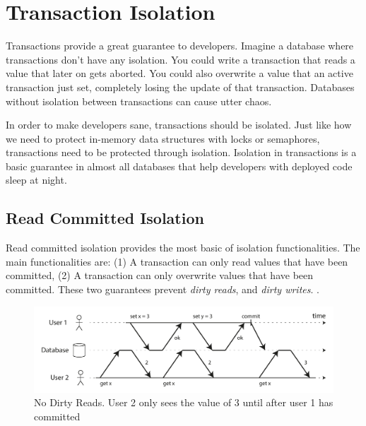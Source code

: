 \documentclass[conference]{IEEEtran}
\begin{document}
    \section{Transaction Isolation}

    Transactions provide a great guarantee to developers. Imagine a database where transactions don't have any isolation. You could write a transaction that reads a value that later on gets aborted. You could also overwrite a value that an active transaction just set, completely losing the update of that transaction. Databases without isolation between transactions can cause utter chaos. 
    
    In order to make developers sane, transactions should be isolated. Just like how we need to protect in-memory data structures with locks or semaphores, transactions need to be protected through isolation. Isolation in transactions is a basic guarantee in almost all databases that help developers with deployed code sleep at night.

    \subsection{Read Committed Isolation}

    Read committed isolation provides the most basic of isolation functionalities. The main functionalities are: (1) A transaction can only read values that have been committed, (2) A transaction can only overwrite values that have been committed. These two guarantees prevent \textit{dirty reads}, and \textit{dirty writes}. \cite[p. 234]{b18}.

    \begin{figure}[h]
        \centering
        \includegraphics[width=\columnwidth]{figures/NoDirtyRead.png}
        \caption{No Dirty Reads. User 2 only sees the value of 3 until after user 1 has committed \cite[p. 234]{b18}}
        \end{figure}
\end{document}
